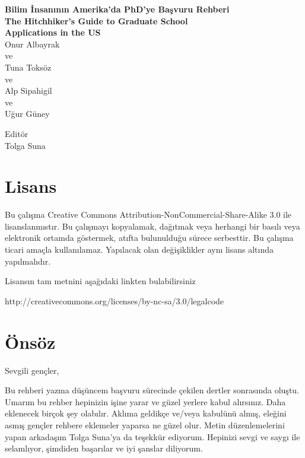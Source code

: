 \documentclass[12pt]{article}
\begin{document}
\thispagestyle{empty}
\setcounter{page}{0}
\begin{center}
\textbf{\Huge{Bilim İnsanının Amerika'da PhD'ye Başvuru Rehberi} \\
\vspace{8mm}
\Large{The Hitchhiker's Guide to Graduate School \\
\vspace{4mm}
Applications in the US }}\\

\vspace{80mm}
\large{Onur Albayrak}
\\
ve 
\\
Tuna Toksöz 
\\
ve 
\\
Alp Sipahigil 
\\
ve 
\\
Uğur Güney \\
\vspace{8mm}

\small{
Editör 
\\
Tolga Suna }
\end{center}
\tableofcontents
\newpage
\section*{Lisans}

Bu çalışma Creative Commons Attribution-NonCommercial-Share-Alike 3.0 ile lisanslanmıstır. Bu çalışmayı kopyalamak, dağıtmak veya herhangi bir basılı veya elektronik ortamda göstermek, atıfta bulunulduğu sürece serbesttir. Bu çalışma ticari amaçla kullanılamaz. Yapılacak olan değişiklikler aynı lisans altında yapılmalıdır. 

Lisansın tam metnini aşağıdaki linkten bulabilirsiniz

http://creativecommons.org/licenses/by-nc-sa/3.0/legalcode

\byncsa
\newpage
%
%
\section{Önsöz}
Sevgili gençler, 

Bu rehberi yazma düşüncem başvuru sürecinde çekilen dertler sonrasında oluştu. Umarım bu rehber hepinizin işine yarar ve güzel yerlere kabul alırsınız. Daha eklenecek birçok şey olabılır. Aklıma geldikçe ve/veya kabulünü almış, eleğini asmış gençler rehbere eklemeler yaparsa ne güzel olur. Metin düzenlemelerini yapan arkadaşım Tolga Suna'ya da teşekkür ediyorum. Hepinizi sevgi ve saygı ile selamlıyor, şimdiden başarılar ve iyi şanslar diliyorum. 
\end{document}
